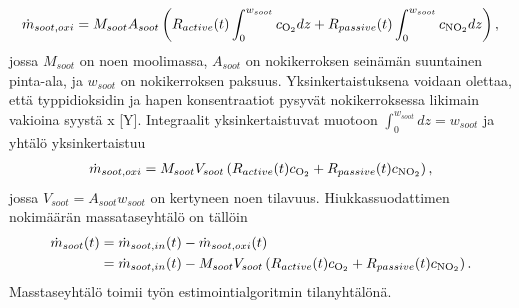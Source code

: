 \begin{align}
    \dot{m}_{soot, oxi} = M_{soot} A_{soot}\left(R_{active}(t) \int_0^{w_{soot}} c_{\ce{O2}} dz +
                 R_{passive}(t) \int_0^{w_{soot}} c_{\ce{NO2}} dz
    \right),
\end{align}
jossa \(M_{soot}\) on noen moolimassa, \(A_{soot}\) on nokikerroksen seinämän suuntainen pinta-ala, ja \(w_{soot}\) on nokikerroksen paksuus. Yksinkertaistuksena  voidaan olettaa, että typpidioksidin ja hapen konsentraatiot pysyvät nokikerroksessa likimain vakioina {\color{red} syystä x [Y]}. 
Integraalit yksinkertaistuvat muotoon 
\(\int_0^{w_{soot}} dz = w_{soot}\)
ja yhtälö yksinkertaistuu 
\begin{align}
    \dot{m}_{soot, oxi} = M_{soot}V_{soot} \left( R_{active}(t)
    c_{\ce{O2}} + R_{passive}(t)c_{\ce{NO2}} \right),
\end{align}
jossa \(V_{soot}=A_{soot}w_{soot}\) on kertyneen noen tilavuus.
Hiukkassuodattimen nokimäärän massataseyhtälö on tällöin
\begin{align}\label{eq:tilanyhtalo_noki}
\begin{split}
    \dot{m} _{soot}(t) &= \dot{m} _{soot, in}(t) - \dot{m} _{soot, oxi}(t)
    \\ & = \dot{m}_{soot, in}(t) - M_{soot}V_{soot} \left( R_{active}(t)c_{\ce{O2}} + R_{passive}(t)c_{\ce{NO2}}\right).
\end{split}
\end{align}
Masstaseyhtälö toimii työn estimointialgoritmin tilanyhtälönä.

